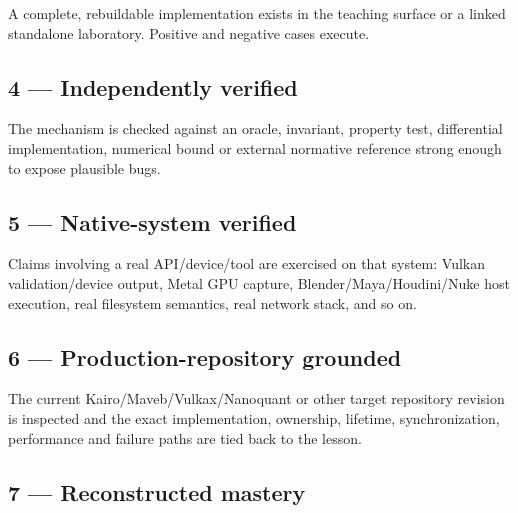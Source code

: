 \hypertarget{appendix-2a2e5bd7143a-reference-implemented}{}

A complete, rebuildable implementation exists in the teaching surface or a linked standalone laboratory. Positive and negative cases execute.

\subsection{4 --- Independently verified}\label{appendix-2a2e5bd7143a-independently-verified}

\hypertarget{appendix-2a2e5bd7143a-independently-verified}{}

The mechanism is checked against an oracle, invariant, property test, differential implementation, numerical bound or external normative reference strong enough to expose plausible bugs.

\subsection{5 --- Native-system verified}\label{appendix-2a2e5bd7143a-native-system-verified}

\hypertarget{appendix-2a2e5bd7143a-native-system-verified}{}

Claims involving a real API/device/tool are exercised on that system: Vulkan validation/device output, Metal GPU capture, Blender/Maya/Houdini/Nuke host execution, real filesystem semantics, real network stack, and so on.

\subsection{6 --- Production-repository grounded}\label{appendix-2a2e5bd7143a-production-repository-grounded}

\hypertarget{appendix-2a2e5bd7143a-production-repository-grounded}{}

The current Kairo/Maveb/Vulkax/Nanoquant or other target repository revision is inspected and the exact implementation, ownership, lifetime, synchronization, performance and failure paths are tied back to the lesson.

\subsection{7 --- Reconstructed mastery}\label{appendix-2a2e5bd7143a-reconstructed-mastery}

\hypertarget{appendix-2a2e5bd7143a-reconstructed-mastery}{}

